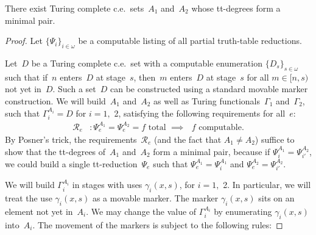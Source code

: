 \documentclass{LMCS}
\newcommand{\0}{\mathbf{0}}
\newcommand{\ce}{c.e.\ }
\newcommand{\<}{\langle}
\renewcommand{\>}{\rangle}
\begin{document}
\begin{thm}\label{minpairthm}
There exist Turing complete c.e.\ sets~$A_1$ and~$A_2$ whose tt-degrees form a
minimal pair.
\end{thm}

\begin{proof}
Let $\{\Psi_i\}_{i\in\omega}$ be a computable listing of all partial
truth-table reductions.

Let~$D$ be a Turing complete \ce set with a computable enumeration
$\{D_s\}_{s\in\omega}$ such that if~$n$ enters~$D$ at stage~$s$, then~$m$
enters~$D$ at stage~$s$ for all $m\in [n,s)$ not yet in~$D$.  Such a set~$D$
can be constructed using a standard movable marker construction.
We will build~$A_1$ and~$A_2$ as well as Turing functionals~$\Gamma_1$
and~$\Gamma_2$, such that $\Gamma_i^{A_i}=D$ for $i=1,$ 2, satisfying the
following requirements for all~$e$:
\begin{align*}
\mathcal R_e &: \Psi_e^{A_1}=\Psi_e^{A_2}=f \text{ total } \implies
 \text{ $f$ computable}.
\end{align*}
By Posner's trick, the requirements~$\mathcal R_e$ (and the fact
that $A_1 \neq A_2$) suffice to show that the tt-degrees of~$A_1$ and~$A_2$
form a minimal pair, because if $\Psi_i^{A_1}=\Psi_{i'}^{A_2}$, we could
build a single tt-reduction~$\Psi_e$ such that $\Psi_e^{A_1}=\Psi_i^{A_1}$
and $\Psi_e^{A_2}=\Psi_{i'}^{A_2}$.

We will build $\Gamma_i^{A_i}$ in stages with uses $\gamma_i(x,s)$, for
$i=1,$ 2.  In particular, we will treat the use $\gamma_i(x,s)$ as a movable
marker.  The marker $\gamma_i(x,s)$ sits on an element not yet in~$A_i$.  We
may change the value of $\Gamma_i^{A_i}$ by enumerating $\gamma_i(x,s)$
into~$A_i$.  The movement of the markers is subject to the following rules:


\end{proof}
\end{document}

